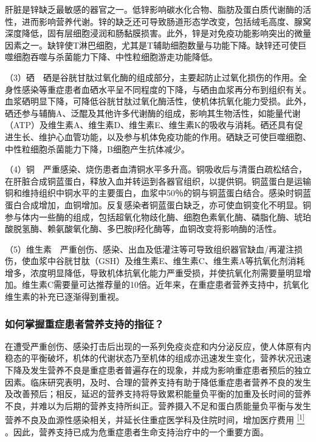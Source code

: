 肝脏是锌缺乏最敏感的器官之一。低锌影响碳水化合物、脂肪及蛋白质代谢酶的活性，进而影响营养代谢。锌的缺乏还可导致肠道形态学改变，包括绒毛高度、腺窝深度降低，固有层细胞浸润和肠黏膜损害。此外，锌是对免疫功能影响突出的微量因素之一。缺锌使T淋巴细胞，尤其是T辅助细胞数量与功能下降。缺锌还可使巨噬细胞吞噬与杀菌能力下降、中性粒细胞游走功能降低。

（3）硒　硒是谷胱甘肽过氧化酶的组成部分，主要起防止过氧化损伤的作用。全身性感染等重症患者血硒水平呈不同程度的下降，与硒由血浆再分布到组织有关。血浆硒明显下降，可降低谷胱甘肽过氧化酶活性，使机体抗氧化能力受损。此外，硒还参与辅酶A、泛醌及其他许多代谢酶的组成，影响其生物活性，如能量代谢（ATP）及维生素A、维生素D、维生素E、维生素K的吸收与消耗。硒还具有促进生长、维护心血管功能，以及参与机体免疫功能的作用。硒缺乏可使巨噬细胞、中性粒细胞杀菌能力下降，B细胞产生抗体减少。

（4）铜　严重感染、烧伤患者血清铜水平多升高。铜吸收后与清蛋白疏松结合，在肝脏合成铜蓝蛋白，释放入血并转运到各器官组织，以提供铜。铜蓝蛋白是运输铜和维持组织中铜水平的主要蛋白，血浆中50％的铜与铜蓝蛋白结合。感染时铜蓝蛋白合成增加，血铜增加。反复感染者铜蓝蛋白缺乏，亦可使血铜变化不明显。铜参与体内一些酶的组成，包括超氧化物歧化酶、细胞色素氧化酶、磷脂化酶、琥珀酸脱氢酶、赖氨酸氧化酶、多巴胺β羟化酶等，血铜改变将影响酶的活性。

（5）维生素　严重创伤、感染、出血及低灌注等可导致组织器官缺血/再灌注损伤，使血浆中谷胱甘肽（GSH）及维生素E、维生素C、维生素A等抗氧化剂消耗增多，浓度明显降低，导致机体抗氧化能力严重受损，并使抗氧化剂需要量明显增加。维生素C需要量可达推荐量的10倍。近年来，在重症患者营养支持中，抗氧化维生素的补充已逐渐得到重视。

\subsubsection{如何掌握重症患者营养支持的指征？}

在遭受严重创伤、感染打击后出现的一系列免疫炎症和内分泌反应，使人体原有内稳态的平衡破坏，机体的代谢状态乃至机体的组成亦迅速发生变化，营养状况迅速下降及发生营养不良是重症患者普遍存在的现象，并成为影响重症患者预后的独立因素。临床研究表明，及时、合理的营养支持有助于降低重症患者营养不良的发生及改善预后；相反，延迟的营养支持将导致累积能量负平衡的加重及长时间的营养不良，并难以为后期的营养支持所纠正。营养摄入不足和蛋白质能量负平衡与发生营养不良及血源性感染相关，并延长住重症医学科及住院时间，增加医疗费用
\protect\hyperlink{text00028.htmlux5cux23ch1-27}{\textsuperscript{{[}1{]}}}
。因此，营养支持已成为危重症患者生命支持治疗中的一个重要方面。


